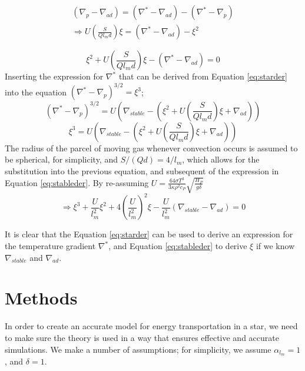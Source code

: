 \documentclass[10pt, nofootinbib, twocolumn]{revtex4-1}
\begin{document}
\begin{equation}\label{eq:relation}
\begin{split}
    (\nabla_p-\nabla_{ad}) = (\nabla^*-\nabla_{ad})-(\nabla^*-\nabla_p) \\
    \Rightarrow U(\frac{S}{Ql_md})\xi = (\nabla^*-\nabla_{ad})-\xi^2
\end{split}
\end{equation}

\begin{equation}\label{eq:starder}
    \xi^2 + U(\frac{S}{Ql_md})\xi-(\nabla^*-\nabla_{ad})=0
\end{equation}
Inserting the expression for $\nabla^*$ that can be derived from Equation \eqref{eq:starder} into the equation $(\nabla^*-\nabla_p)^{3/2}=\xi^3$;
$$(\nabla^*-\nabla_p)^{3/2}=U(\nabla_{stable}-(\xi^2 + U(\frac{S}{Ql_md})\xi+\nabla_{ad}))$$
$$\xi^3=U(\nabla_{stable}-(\xi^2 + U(\frac{S}{Ql_md})\xi+\nabla_{ad}))$$
The radius of the parcel of moving gas whenever convection occurs is assumed to be spherical, for simplicity, and $S/(Qd)=4/l_m$, which allows for the substitution into the previous equation, and subsequent of the expression in Equation \eqref{eq:stableder}. By re-assuming $U=\frac{64\sigma T^3}{3\kappa\rho^2c_P}\sqrt{\frac{H_P}{g\delta}}$
\begin{equation}\label{eq:stableder}
    \Rightarrow \xi^3 + \frac{U}{l_m^2}\xi^2+4(\frac{U}{l_m^2})^2\xi-\frac{U}{l_m^2}(\nabla_{stable}-\nabla_{ad})=0
\end{equation}

It is clear that the Equation \eqref{eq:starder} can be used to derive an expression for the temperature gradient $\nabla^*$, and Equation \eqref{eq:stableder} to derive $\xi$ if we know $\nabla_{stable}$ and $\nabla_{ad}$.






\section{Methods}\label{sec:methods} 
In order to create an accurate model for energy transportation in a star, we need to make sure the theory is used in a way that ensures effective and accurate simulations. We make a number of assumptions; for simplicity, we assume $\alpha_{l_m}=1$, and $\delta = 1$. %
\end{document}
